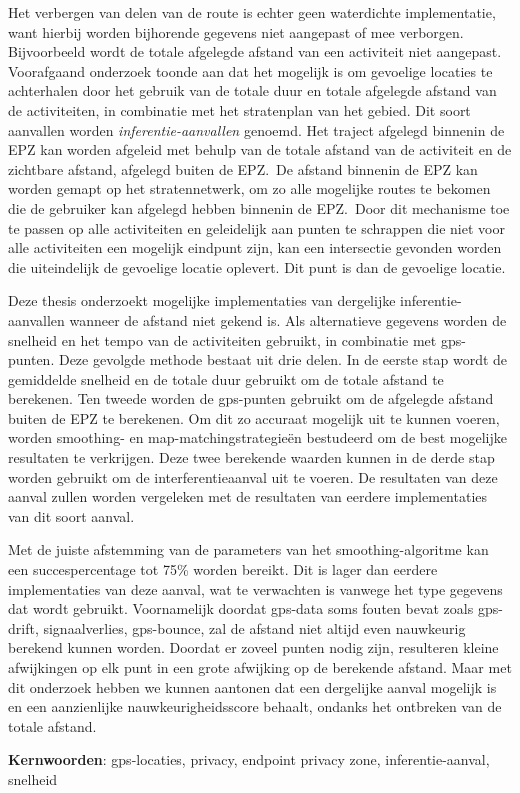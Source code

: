 Het verbergen van delen van de route is echter geen waterdichte implementatie,
want hierbij worden bijhorende gegevens niet aangepast of mee verborgen.
Bijvoorbeeld wordt de totale afgelegde afstand van een activiteit niet
aangepast. Voorafgaand onderzoek toonde aan dat het mogelijk is om gevoelige
locaties te achterhalen door het gebruik van de totale duur en totale afgelegde
afstand van de activiteiten, in combinatie met het stratenplan van het gebied.
Dit soort aanvallen worden \textit{inferentie-aanvallen} genoemd. Het traject
afgelegd binnenin de EPZ kan worden afgeleid met behulp van de totale afstand
van de activiteit en de zichtbare afstand, afgelegd buiten de EPZ.\ De afstand
binnenin de EPZ kan worden gemapt op het stratennetwerk, om zo alle mogelijke
routes te bekomen die de gebruiker kan afgelegd hebben binnenin de EPZ.\ Door
dit mechanisme toe te passen op alle activiteiten en geleidelijk aan punten te
schrappen die niet voor alle activiteiten een mogelijk eindpunt zijn, kan een
intersectie gevonden worden die uiteindelijk de gevoelige locatie oplevert. Dit
punt is dan de gevoelige locatie.

Deze thesis onderzoekt mogelijke implementaties van dergelijke
inferentie-aanvallen wanneer de afstand niet gekend is. Als alternatieve
gegevens worden de snelheid en het tempo van de activiteiten gebruikt, in
combinatie met gps-punten. Deze gevolgde methode bestaat uit drie delen. In de
eerste stap wordt de gemiddelde snelheid en de totale duur gebruikt om de
totale afstand te berekenen. Ten tweede worden de gps-punten gebruikt om de
afgelegde afstand buiten de EPZ te berekenen. Om dit zo accuraat mogelijk uit
te kunnen voeren, worden smoothing- en map-matchingstrategieën bestudeerd om de
best mogelijke resultaten te verkrijgen. Deze twee berekende waarden kunnen in
de derde stap worden gebruikt om de interferentieaanval uit te voeren. De
resultaten van deze aanval zullen worden vergeleken met de resultaten van
eerdere implementaties van dit soort aanval.

Met de juiste afstemming van de parameters van het smoothing-algoritme kan een
succespercentage tot 75\% worden bereikt. Dit is lager dan eerdere
implementaties van deze aanval, wat te verwachten is vanwege het type gegevens
dat wordt gebruikt. Voornamelijk doordat gps-data soms fouten bevat zoals
gps-drift, signaalverlies, gps-bounce, zal de afstand niet altijd even
nauwkeurig berekend kunnen worden. Doordat er zoveel punten nodig zijn,
resulteren kleine afwijkingen op elk punt in een grote afwijking op de
berekende afstand. Maar met dit onderzoek hebben we kunnen aantonen dat een
dergelijke aanval mogelijk is en een aanzienlijke nauwkeurigheidsscore behaalt,
ondanks het ontbreken van de totale afstand.

\textbf{Kernwoorden}: gps-locaties, privacy, endpoint privacy zone,
inferentie-aanval, snelheid